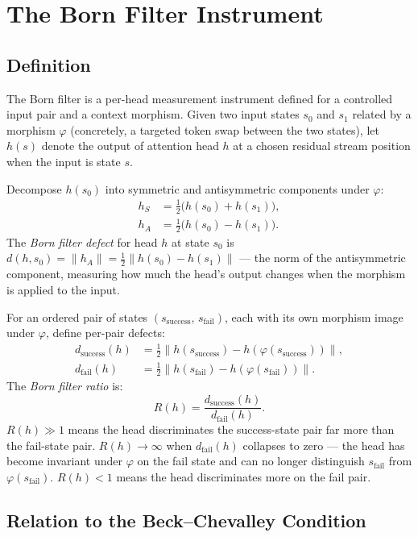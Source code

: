 \section{The Born Filter Instrument}
\label{sec:born-filter}

\subsection{Definition}

The Born filter is a per-head measurement instrument defined for a controlled
input pair and a context morphism.
Given two input states $s_0$ and $s_1$ related by a morphism $\varphi$
(concretely, a targeted token swap between the two states), let $h(s)$ denote
the output of attention head $h$ at a chosen residual stream position when the
input is state $s$.

Decompose $h(s_0)$ into symmetric and antisymmetric components under $\varphi$:
\begin{align}
h_S &= \tfrac{1}{2}\bigl(h(s_0) + h(s_1)\bigr), \\
h_A &= \tfrac{1}{2}\bigl(h(s_0) - h(s_1)\bigr).
\end{align}
The \emph{Born filter defect} for head $h$ at state $s_0$ is
$d(h, s_0) = \|h_A\| = \tfrac{1}{2}\|h(s_0) - h(s_1)\|$ --- the norm of the
antisymmetric component, measuring how much the head's output changes when the
morphism is applied to the input.

For an ordered pair of states $(s_\text{success},\, s_\text{fail})$, each
with its own morphism image under $\varphi$, define per-pair defects:
\begin{align}
d_\text{success}(h) &= \tfrac{1}{2}\bigl\|h(s_\text{success})
                        - h(\varphi(s_\text{success}))\bigr\|, \\
d_\text{fail}(h)    &= \tfrac{1}{2}\bigl\|h(s_\text{fail})
                        - h(\varphi(s_\text{fail}))\bigr\|.
\end{align}
The \emph{Born filter ratio} is:
\[
R(h) = \frac{d_\text{success}(h)}{d_\text{fail}(h)}.
\]
$R(h) \gg 1$ means the head discriminates the success-state pair far more
than the fail-state pair.
$R(h) \to \infty$ when $d_\text{fail}(h)$ collapses to zero --- the head has
become invariant under $\varphi$ on the fail state and can no longer
distinguish $s_\text{fail}$ from $\varphi(s_\text{fail})$.
$R(h) < 1$ means the head discriminates more on the fail pair.

\subsection{Relation to the Beck--Chevalley Condition}

